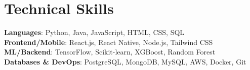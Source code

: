 \documentclass[letterpaper,11pt]{article}
\begin{document}
\section{Technical Skills}
 \begin{itemize}[leftmargin=0.15in, label={}]
    \small{\item{
     \textbf{Languages}{: Python, Java, JavaScript, HTML, CSS, SQL} \\
     \textbf{Frontend/Mobile}{: React.js, React Native, Node.js, Tailwind CSS} \\
     \textbf{ML/Backend}{: TensorFlow, Scikit-learn, XGBoost, Random Forest} \\
     \textbf{Databases \& DevOps}{: PostgreSQL, MongoDB, MySQL, AWS, Docker, Git}
    }}
 \end{itemize}
\end{document}

